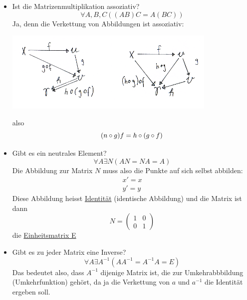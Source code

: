 \documentclass[a4paper,10pt]{report}
\begin{document}
\begin{itemize}
\item
	Ist die Matrizenmultiplikation assoziativ?
	\begin{equation*}\forall A,B,C((AB)C = A(BC))\end{equation*}
	Ja, denn die Verkettung von Abbildungen ist assoziativ:\\
	\begin{center}
	 	\includegraphics[width=0.8\textwidth]{imgs/MatrizenAssoziativ.png}
	\end{center}
	also
	\begin{equation*}
		(n \circ g)f = h \circ (g\circ f)\\
	\end{equation*}
\item
	Gibt es ein neutrales Element?
	\begin{equation*}
		\forall A \exists N(AN = NA =A)
	\end{equation*}
	Die Abbildung zur Matrix $N$ muss also die Punkte auf sich selbst abbilden:
	\begin{eqnarray*}
		x' = x\\
		y' = y
	\end{eqnarray*}
	Diese Abbildung heisst \underline{Identität} (identische Abbildung) und die Matrix ist dann
	\begin{equation*}
		N = \begin{pmatrix}1&0\\0&1\end{pmatrix}
	\end{equation*}
	die \underline{Einheitsmatrix E}
\item
	Gibt es zu jeder Matrix eine Inverse?
	\begin{equation*}\forall A \exists A^{-1}(AA^{-1}= A^{-1}A = E)\end{equation*}
	Das bedeutet also, dass $A^{-1}$ dijenige Matrix ist, die zur Umkehrabbbildung (Umkehrfunktion) gehört, da ja die Verkettung von $a$ und $a^{-1}$ die Identität ergeben soll.\\
	\begin{center}

\end{center}
\end{itemize}
\end{document}
